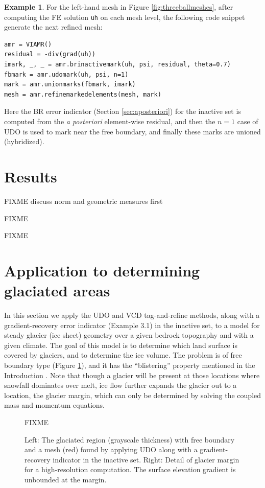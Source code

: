 \documentclass[]{interact}
\theoremstyle{plain}%
\theoremstyle{definition}
\newtheorem{example}[theorem]{Example}
\theoremstyle{remark}
\begin{document}
\begin{example} \label{example:hybrid}
For the left-hand mesh in Figure \ref{fig:threeballmeshes}, after computing the FE solution \texttt{uh} on each mesh level, the following code snippet generate the next refined mesh:
\begin{verbatim}
amr = VIAMR()
residual = -div(grad(uh))
imark, _, _ = amr.brinactivemark(uh, psi, residual, theta=0.7)
fbmark = amr.udomark(uh, psi, n=1)
mark = amr.unionmarks(fbmark, imark)
mesh = amr.refinemarkedelements(mesh, mark)
\end{verbatim}
Here the BR error indicator (Section \ref{sec:aposteriori}) for the inactive set is computed from the \emph{a posteriori} element-wise residual, and then the $n=1$ case of UDO is used to mark near the free boundary, and finally these marks are unioned (hybridized).
\end{example}



\section{Results} \label{sec:results}

FIXME discuss norm and geometric measures first

FIXME \cite{Kosub2016} \cite{JungeblutKleistMiltzow2022}

FIXME


\section{Application to determining glaciated areas} \label{sec:app}

In this section we apply the UDO and VCD tag-and-refine methods, along with a gradient-recovery error indicator (Example 3.1) in the inactive set, to a model for steady glacier (ice sheet) geometry over a given bedrock topography and with a given climate.  The goal of this model is to determine which land surface is covered by glaciers, and to determine the ice volume.  The problem is of free boundary type (Figure \ref{fig:glacier}), and it has the ``blistering'' property mentioned in the Introduction \cite{JouvetBueler2012}.  Note that though a glacier will be present at those locations where snowfall dominates over melt, ice flow further expands the glacier out to a location, the glacier margin, which can only be determined by solving the coupled mass and momentum equations.

\begin{figure}[ht]
\centering
FIXME
\caption{Left:  The glaciated region (grayscale thickness) with free boundary and a mesh (red) found by applying UDO along with a gradient-recovery indicator in the inactive set.  Right:  Detail of glacier margin for a high-resolution computation.  The surface elevation gradient is unbounded at the margin.}
\label{fig:glacier}
\end{figure}
\end{document}
